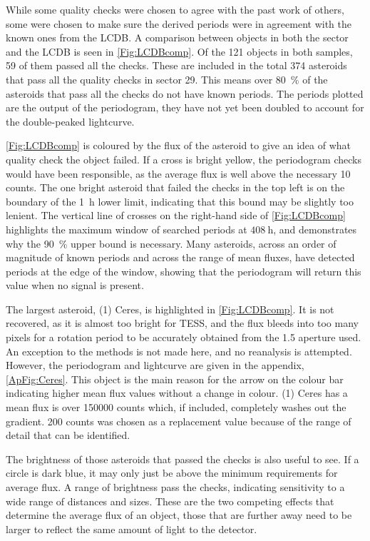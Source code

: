\documentclass{UCreport}
\begin{document}
While some quality checks were chosen to agree with the past work of others, some were chosen to make sure the derived periods were in agreement with the known ones from the LCDB.
A comparison between objects in both the sector and the LCDB is seen in \autoref{Fig:LCDBcomp}.
Of the 121 objects in both samples, 59 of them passed all the checks.
These are included in the total 374 asteroids that pass  all the quality checks in sector 29.
This means over \qty{80}{\percent} of the asteroids that pass all the checks do not have known periods.
The periods plotted are the output of the periodogram, they have not yet been doubled to account for the double-peaked lightcurve.

\autoref{Fig:LCDBcomp} is coloured by the flux of the asteroid to give an idea of what quality check the object failed.
If a cross is bright yellow, the periodogram checks would have been responsible, as the average flux is well above the necessary 10 counts.
The one bright asteroid that failed the checks in the top left is on the boundary of the \qty{1}{\hour} lower limit, indicating that this bound may be slightly too lenient.
The vertical line of crosses on the right-hand side of \autoref{Fig:LCDBcomp} highlights the maximum window of searched periods at $\qty{408}{\hour}$, and demonstrates why the \qty{90}{\percent} upper bound is necessary.
Many asteroids, across an order of magnitude of known periods and across the range of mean fluxes, have detected periods at the edge of the window, showing that the periodogram will return this value when no signal is present.

The largest asteroid, (1) Ceres, is highlighted in \autoref{Fig:LCDBcomp}.
It is not recovered, as it is almost too bright for TESS, and the flux bleeds into too many pixels for a rotation period to be accurately obtained from the \qty{1.5}{\px} aperture used.
An exception to the methods is not made here, and no reanalysis is attempted.
However, the periodogram and lightcurve are given in the appendix, \autoref{ApFig:Ceres}.
This object is the main reason for the arrow on the colour bar indicating higher mean flux values without a change in colour.
(1) Ceres has a mean flux is over 150000 counts which, if included, completely washes out the gradient.
200 counts was chosen as a replacement value because of the range of detail that can be identified.

The brightness of those asteroids that passed the checks is also useful to see.
If a circle is dark blue, it may only just be above the minimum requirements for average flux.
A range of brightness pass the checks, indicating sensitivity to a wide range of distances and sizes.
These are the two competing effects that determine the average flux of an object, those that are further away need to be larger to reflect the same amount of light to the detector.
\end{document}
